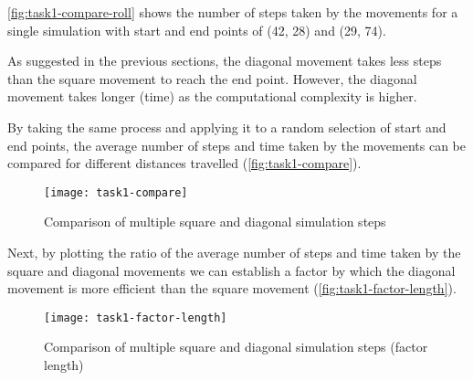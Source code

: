 \autoref{fig:task1-compare-roll} shows the number of steps taken by the movements for a single simulation with start and end points of (42, 28) and (29, 74).


As suggested in the previous sections, the diagonal movement takes less steps than the square movement to reach the end point.
However, the diagonal movement takes longer (time) as the computational complexity is higher.



\clearpage

By taking the same process and applying it to a random selection of start and end points, 
the average number of steps and time taken by the movements can be compared for different distances travelled (\autoref{fig:task1-compare}).



\begin{figure}[ht]
    \centering
    \texttt{[image: task1-compare]}
    \caption[Comparison of multiple square and diagonal simulation steps]{Comparison of multiple square and diagonal simulation steps}
    \label{fig:task1-compare}
\end{figure}

Next, by plotting the ratio of the average number of steps and time taken by the square and diagonal movements
we can establish a factor by which the diagonal movement is more efficient than the square movement (\autoref{fig:task1-factor-length}).

\begin{figure}[ht]
    \centering
    \texttt{[image: task1-factor-length]}
    \caption[Comparison of multiple square and diagonal simulation steps (factor length)]{Comparison of multiple square and diagonal simulation steps (factor length)}
    \label{fig:task1-factor-length}
\end{figure}

